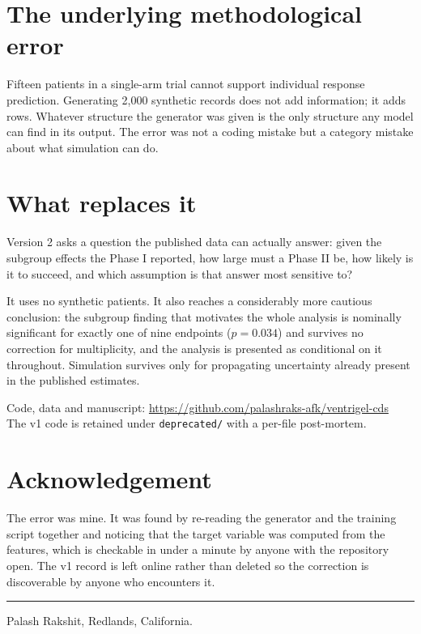 \documentclass[11pt,letterpaper]{article}
\begin{document}
\section{The underlying methodological error}

Fifteen patients in a single-arm trial cannot support individual response prediction. Generating
2{,}000 synthetic records does not add information; it adds rows. Whatever structure the generator
was given is the only structure any model can find in its output. The error was not a coding mistake
but a category mistake about what simulation can do.

\section{What replaces it}

Version 2 asks a question the published data can actually answer: given the subgroup effects the
Phase I reported, how large must a Phase II be, how likely is it to succeed, and which assumption is
that answer most sensitive to?

It uses no synthetic patients. It also reaches a considerably more cautious conclusion: the subgroup
finding that motivates the whole analysis is nominally significant for exactly one of nine endpoints
($p = 0.034$) and survives no correction for multiplicity, and the analysis is presented as
conditional on it throughout. Simulation survives only for propagating uncertainty already present in
the published estimates.

Code, data and manuscript: \url{https://github.com/palashraks-afk/ventrigel-cds}\\
The v1 code is retained under \texttt{deprecated/} with a per-file post-mortem.

\section{Acknowledgement}

The error was mine. It was found by re-reading the generator and the training script together and
noticing that the target variable was computed from the features, which is checkable in under a
minute by anyone with the repository open. The v1 record is left online rather than deleted so the
correction is discoverable by anyone who encounters it.

\vspace{10pt}
\hrule
\vspace{6pt}
\noindent\small Palash Rakshit, Redlands, California.
\end{document}
